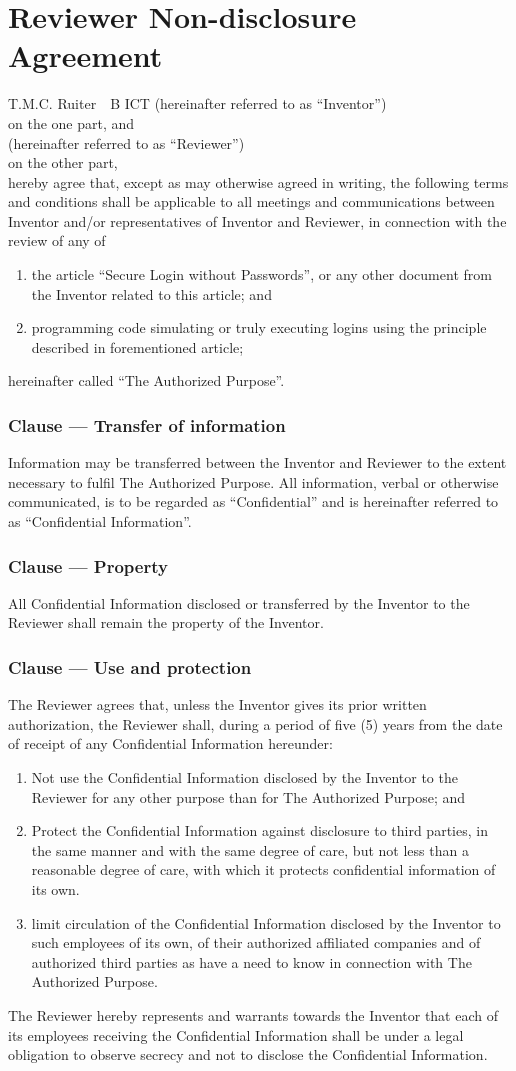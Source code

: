 \documentclass[a4paper]{article}
\newcounter{clausenr}
\newcommand{\clause}[1]{\addtocounter{clausenr}{1}\subsubsection{Clause \Roman{clausenr} --- #1}}
\begin{document}
\section{Reviewer Non-disclosure Agreement}
\par
\vspace{1.5cm}
T.M.C. Ruiter\ \  B ICT\hfill
(hereinafter referred to as ``Inventor'')\\[.5cm]
on the one part, and\\[.5cm]
\hfill
(hereinafter referred to as ``Reviewer'')\\[.5cm]
on the other part,\\[.5cm]
hereby agree that,
except as may otherwise agreed in writing,
the following terms and conditions shall be applicable to all meetings and communications between
Inventor and/or representatives of Inventor and Reviewer,
in connection with the review of any of
\begin{enumerate}
\item the article ``Secure Login without Passwords'',
or any other document from the Inventor related to this article; and
\item programming code simulating or truly executing logins using the principle described in forementioned article;
\end{enumerate}
hereinafter called ``The Authorized Purpose''.

\clause{Transfer of information}
Information may be transferred between the Inventor and Reviewer to the extent necessary to fulfil The Authorized Purpose.
All information,
verbal or otherwise communicated,
is to be regarded as ``Confidential'' and is hereinafter referred to as ``Confidential Information''.

\clause{Property}
All Confidential Information disclosed or transferred by the Inventor to the Reviewer shall remain the property of the Inventor.

\clause{Use and protection}
The Reviewer agrees that,
unless the Inventor gives its prior written authorization,
the Reviewer shall,
during a period of five (5) years from the date of receipt of any Confidential Information hereunder:
\begin{enumerate}
\item Not use the Confidential Information disclosed by the Inventor to the Reviewer for any other purpose than for The Authorized Purpose; and
\item Protect the Confidential Information against disclosure to third parties,
in the same manner and with the same degree of care,
but not less than a reasonable degree of care,
with which it protects confidential information of its own.
\item limit circulation of the Confidential Information disclosed by the Inventor to such employees of its own,
of their authorized affiliated companies and of authorized third parties as have a need to know in connection with The Authorized Purpose.
\end{enumerate}
The Reviewer hereby represents and warrants towards the Inventor that each of its employees
receiving the Confidential Information shall be under a legal obligation to observe secrecy and not to
disclose the Confidential Information.
\end{document}
